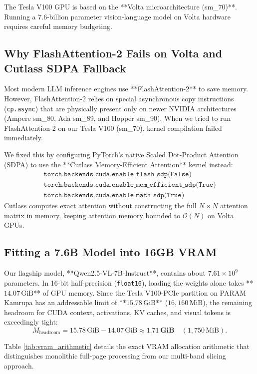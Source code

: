 The Tesla V100 GPU is based on the **Volta microarchitecture (sm\_70)**. Running a 7.6-billion parameter vision-language model on Volta hardware requires careful memory budgeting.

\subsection{Why FlashAttention-2 Fails on Volta and Cutlass SDPA Fallback}
Most modern LLM inference engines use **FlashAttention-2** \cite{dao2022flashattention} to save memory. However, FlashAttention-2 relies on special asynchronous copy instructions (\texttt{cp.async}) that are physically present only on newer NVIDIA architectures (Ampere sm\_80, Ada sm\_89, and Hopper sm\_90). When we tried to run FlashAttention-2 on our Tesla V100 (sm\_70), kernel compilation failed immediately.

We fixed this by configuring PyTorch's native Scaled Dot-Product Attention (SDPA) to use the **Cutlass Memory-Efficient Attention** kernel instead:
\begin{align}
\texttt{torch.backends.cuda.enable\_flash\_sdp(False)} \\
\texttt{torch.backends.cuda.enable\_mem\_efficient\_sdp(True)} \\
\texttt{torch.backends.cuda.enable\_math\_sdp(True)}
\end{align}
Cutlass computes exact attention without constructing the full $N \times N$ attention matrix in memory, keeping attention memory bounded to $\mathcal{O}(N)$ on Volta GPUs.

\subsection{Fitting a 7.6B Model into 16GB VRAM}
Our flagship model, **Qwen2.5-VL-7B-Instruct**, contains about $7.61 \times 10^9$ parameters. In 16-bit half-precision (\texttt{float16}), loading the weights alone takes **$14.07\,\text{GiB}$** of GPU memory. Since the Tesla V100-PCIe partition on PARAM Kamrupa has an addressable limit of **$15.78\,\text{GiB}$** ($16,160\,\text{MiB}$), the remaining headroom for CUDA context, activations, KV caches, and visual tokens is exceedingly tight:
\begin{equation}
M_{\text{headroom}} = 15.78\,\text{GiB} - 14.07\,\text{GiB} \approx \mathbf{1.71\,\text{GiB}} \quad (1,750\,\text{MiB}).
\end{equation}

Table \ref{tab:vram_arithmetic} details the exact VRAM allocation arithmetic that distinguishes monolithic full-page processing from our multi-band slicing approach.

